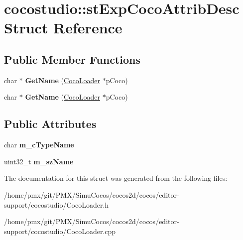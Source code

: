 \hypertarget{structcocostudio_1_1stExpCocoAttribDesc}{}\section{cocostudio\+:\+:st\+Exp\+Coco\+Attrib\+Desc Struct Reference}
\label{structcocostudio_1_1stExpCocoAttribDesc}
\subsection*{Public Member Functions}
\begin{DoxyCompactItemize}
\item 
\mbox{\label{structcocostudio_1_1stExpCocoAttribDesc_a40ca9b6f5e9949ea2a1cc4e2b2fdb145}} 
char $\ast$ {\bfseries Get\+Name} (\hyperlink{classcocostudio_1_1CocoLoader}{Coco\+Loader} $\ast$p\+Coco)
\item 
\mbox{\label{structcocostudio_1_1stExpCocoAttribDesc_abef00ff561a98901f7e19e4bc09002c3}} 
char $\ast$ {\bfseries Get\+Name} (\hyperlink{classcocostudio_1_1CocoLoader}{Coco\+Loader} $\ast$p\+Coco)
\end{DoxyCompactItemize}
\subsection*{Public Attributes}
\begin{DoxyCompactItemize}
\item 
\mbox{\label{structcocostudio_1_1stExpCocoAttribDesc_a4b607fdceef3c865950ca26f6112489f}} 
char {\bfseries m\+\_\+c\+Type\+Name}
\item 
\mbox{\label{structcocostudio_1_1stExpCocoAttribDesc_a66d629b0dd576f1b75d1c2396ff2aa99}} 
uint32\+\_\+t {\bfseries m\+\_\+sz\+Name}
\end{DoxyCompactItemize}


The documentation for this struct was generated from the following files\+:\begin{DoxyCompactItemize}
\item 
/home/pmx/git/\+P\+M\+X/\+Simu\+Cocos/cocos2d/cocos/editor-\/support/cocostudio/Coco\+Loader.\+h\item 
/home/pmx/git/\+P\+M\+X/\+Simu\+Cocos/cocos2d/cocos/editor-\/support/cocostudio/Coco\+Loader.\+cpp\end{DoxyCompactItemize}
